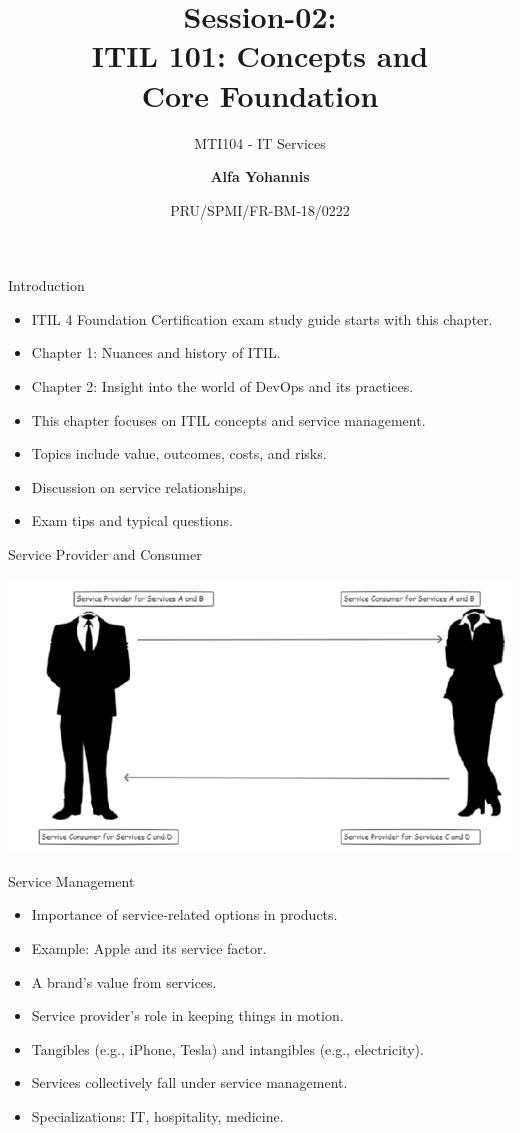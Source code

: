 \documentclass[aspectratio=169, table]{beamer}
\subtitle{MTI104 - IT Services}
\title{Session-02:\\\LARGE{ITIL 101: Concepts and\\Core Foundation}}
\date[Serial]{\scriptsize {PRU/SPMI/FR-BM-18/0222}}
\author[Pradita]{\small{\textbf{Alfa Yohannis}}}
\begin{document}
\frame{\titlepage}

\begin{frame}{Introduction}
	\begin{itemize} 
		\item ITIL 4 Foundation Certification exam study guide starts with this chapter.
		\item Chapter 1: Nuances and history of ITIL.
		\item Chapter 2: Insight into the world of DevOps and its practices.
		\item This chapter focuses on ITIL concepts and service management.
		\item Topics include value, outcomes, costs, and risks.
		\item Discussion on service relationships.
		\item Exam tips and typical questions.
	\end{itemize}
\end{frame}

\begin{frame}{Service Provider and Consumer}
\begin{center}
	\includegraphics[width=0.8\linewidth]{images/image-01.png}
\end{center}
\end{frame}

\begin{frame}{Service Management}
	\begin{itemize}
		\item Importance of service-related options in products.
		\item Example: Apple and its service factor.
		\item A brand's value from services.
		\item Service provider's role in keeping things in motion.
		\item Tangibles (e.g., iPhone, Tesla) and intangibles (e.g., electricity).
		\item Services collectively fall under service management.
		\item Specializations: IT, hospitality, medicine.
	\end{itemize}
\end{frame}
\end{document}
